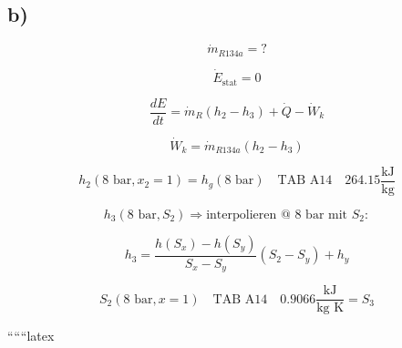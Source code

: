 

\subsection*{b)}

\[
\dot{m}_{R134a} = ?
\]

\[
\dot{E}_{\text{stat}} = 0
\]

\[
\frac{dE}{dt} = \dot{m}_R (h_2 - h_3) + \dot{Q} - \dot{W}_k
\]

\[
\dot{W}_k = \dot{m}_{R134a} (h_2 - h_3)
\]

\[
h_2 (8 \text{ bar}, x_2 = 1) = h_g (8 \text{ bar}) \quad \text{TAB A14} \quad 264.15 \frac{\text{kJ}}{\text{kg}}
\]

\[
h_3 (8 \text{ bar}, S_2) \Rightarrow \text{interpolieren @ 8 bar mit } S_2 :
\]

\[
h_3 = \frac{h(S_x) - h(S_y)}{S_x - S_y} (S_2 - S_y) + h_y
\]

\[
S_2 (8 \text{ bar}, x = 1) \quad \text{TAB A14} \quad 0.9066 \frac{\text{kJ}}{\text{kg K}} = S_3
\]

``````latex